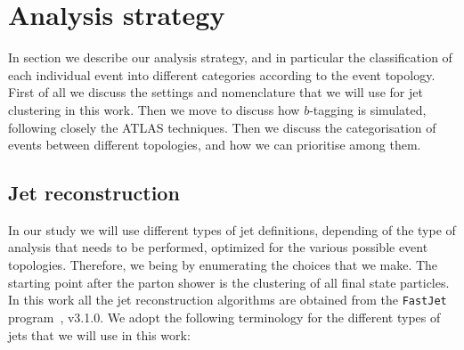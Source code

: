 
\section{Analysis strategy}
\label{sec:analysis}

In section we describe our analysis strategy, and in particular
the classification of each individual event into
different categories according to the event topology.
%
First of all we discuss the settings and nomenclature that
we will use for jet clustering in this work.
%
Then we move to discuss how $b$-tagging is simulated,
following closely the ATLAS techniques.
%
Then we discuss the categorisation of events between different
topologies, and how we can prioritise among them.


\subsection{Jet reconstruction}

In our study we will use different types of jet definitions,
depending of the type of analysis that needs to be performed, optimized
for the various possible event topologies.
%
Therefore, we being by enumerating the choices that we make.
%
The starting point after the parton shower is the clustering
of all final state particles.
%
In this work all the jet reconstruction algorithms
are obtained from the {\tt FastJet} program~\cite{Cacciari:2011ma},
v3.1.0.
%
We adopt the following terminology for the different types of jets
that we will use in this work:

